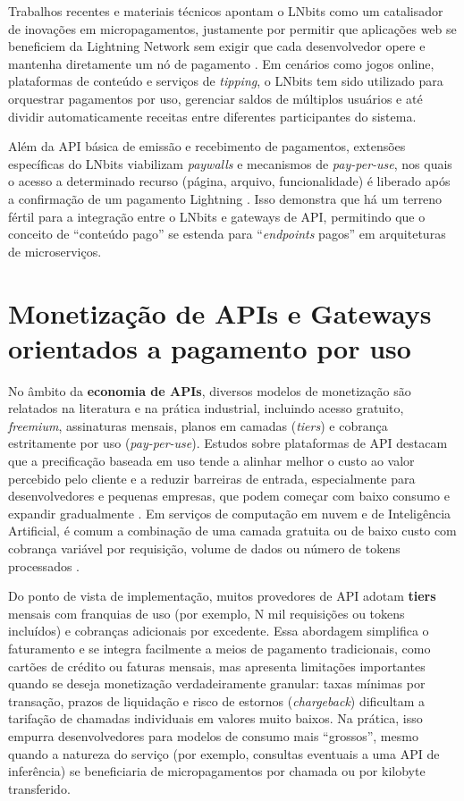 \documentclass[openright]{normas-utf-tex}
\begin{document}
Trabalhos recentes e materiais técnicos apontam o LNbits como um catalisador de inovações em micropagamentos, justamente por permitir que aplicações web se beneficiem da Lightning Network sem exigir que cada desenvolvedor opere e mantenha diretamente um nó de pagamento \cite{rodriguez2024survey}. Em cenários como jogos online, plataformas de conteúdo e serviços de \textit{tipping}, o LNbits tem sido utilizado para orquestrar pagamentos por uso, gerenciar saldos de múltiplos usuários e até dividir automaticamente receitas entre diferentes participantes do sistema.

Além da API básica de emissão e recebimento de pagamentos, extensões específicas do LNbits viabilizam \textit{paywalls} e mecanismos de \textit{pay-per-use}, nos quais o acesso a determinado recurso (página, arquivo, funcionalidade) é liberado após a confirmação de um pagamento Lightning \cite{lnbitsdocs}. Isso demonstra que há um terreno fértil para a integração entre o LNbits e gateways de API, permitindo que o conceito de ``conteúdo pago'' se estenda para ``\textit{endpoints} pagos'' em arquiteturas de microserviços.

\section{Monetização de APIs e Gateways orientados a pagamento por uso}

No âmbito da \textbf{economia de APIs}, diversos modelos de monetização são relatados na literatura e na prática industrial, incluindo acesso gratuito, \textit{freemium}, assinaturas mensais, planos em camadas (\textit{tiers}) e cobrança estritamente por uso (\textit{pay-per-use}). Estudos sobre plataformas de API destacam que a precificação baseada em uso tende a alinhar melhor o custo ao valor percebido pelo cliente e a reduzir barreiras de entrada, especialmente para desenvolvedores e pequenas empresas, que podem começar com baixo consumo e expandir gradualmente \cite{rozik2022apieconomy}. Em serviços de computação em nuvem e de Inteligência Artificial, é comum a combinação de uma camada gratuita ou de baixo custo com cobrança variável por requisição, volume de dados ou número de tokens processados \cite{trefke2020usagebased}.

Do ponto de vista de implementação, muitos provedores de API adotam \textbf{tiers} mensais com franquias de uso (por exemplo, N mil requisições ou tokens incluídos) e cobranças adicionais por excedente. Essa abordagem simplifica o faturamento e se integra facilmente a meios de pagamento tradicionais, como cartões de crédito ou faturas mensais, mas apresenta limitações importantes quando se deseja monetização verdadeiramente granular: taxas mínimas por transação, prazos de liquidação e risco de estornos (\textit{chargeback}) dificultam a tarifação de chamadas individuais em valores muito baixos. Na prática, isso empurra desenvolvedores para modelos de consumo mais “grossos”, mesmo quando a natureza do serviço (por exemplo, consultas eventuais a uma API de inferência) se beneficiaria de micropagamentos por chamada ou por kilobyte transferido.
\end{document}
